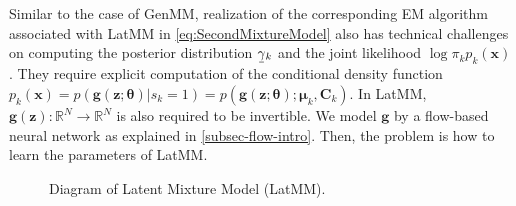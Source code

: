 Similar to the case of GenMM, realization of the corresponding EM
algorithm associated with LatMM in \autoref{eq:SecondMixtureModel}
also has technical challenges on computing the posterior distribution $\ubar{\gamma}_k$ and the joint likelihood $\log{\pi_k p_k(\bm{x})}$. They require explicit computation of the conditional density function $p_k(\bm{x}) = p(\bm{g}(\bm{z};\bm{\theta})| s_k=1) = p(\bm{g}(\bm{z};\bm{\theta});\bm{\mu}_k, \bm{C}_k) $. In LatMM, $\bm{g}(\bm{z}): \mathbb{R}^N \rightarrow \mathbb{R}^N$ is also required to be invertible. We model $\bm{g}$ by a flow-based neural network as explained in \autoref{subsec-flow-intro}.
Then, the problem is how to learn the parameters of LatMM. 
\begin{figure}
  \caption{Diagram of Latent Mixture Model (LatMM).}\label{dia-emgm-sm}
  \vspace{0.1cm}
\end{figure}

